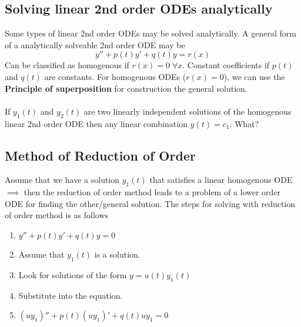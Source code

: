 \documentclass{report}
\theoremstyle{definition}
\theoremstyle{plain}
\theoremstyle{remark}
\begin{document}
\subsection{Solving linear 2nd order ODEs analytically}
Some types of linear 2nd order ODEs may be solved analytically. A general form
of a analytically solveable 2nd order ODE may be
$$ y'' + p(t) y' + q(t) y = r(x) $$
Can be classified as homogenous if $ r(x) = 0 \; \forall x $. Constant
coefficients if $ p(t)  $ and $ q(t) $ are constants. For homogenous ODEs
($ r(x) = 0 $), we can use the \textbf{Principle of superposition} for
construction the general solution.
\\\\
If $ y_1(t) $ and $ y_2(t) $ are two linearly independent solutions of the
homogenous linear 2nd order ODE then any linear combination $ y(t) = c_1 $.
What?
\subsection{Method of Reduction of Order}
Assume that we have a solution $ y_1(t) $ that satisfies a linear homogenous
ODE $ \implies $ then the reduction of order method leads to a problem of
a lower order ODE for finding the other/general solution. The steps for solving
with reduction of order method is as follows
\begin{enumerate}
  \item $ y'' + p(t) y' + q(t) y = 0 $
  \item Assume that $ y_1 (t) $ is a solution.
  \item Look for solutions of the form $ y = u(t)y_1(t) $
  \item Substitute into the equation.
  \item $ (u y_1)'' + p(t) (u y_1)' + q(t) u y_1 = 0 $
\end{enumerate}
\end{document}
